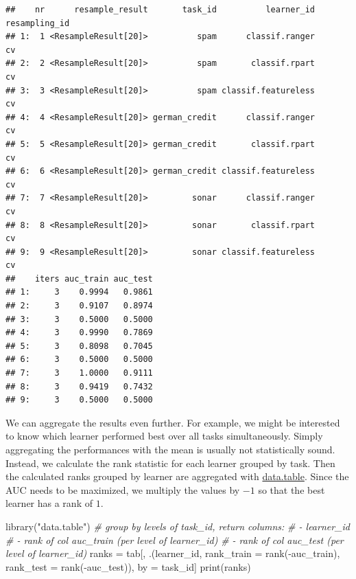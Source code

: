 \documentclass[
]{scrbook}
\newenvironment{Shaded}{\begin{snugshade}}{\end{snugshade}}
\newcommand{\AttributeTok}[1]{\textcolor[rgb]{0.77,0.63,0.00}{#1}}
\newcommand{\CommentTok}[1]{\textcolor[rgb]{0.56,0.35,0.01}{\textit{#1}}}
\newcommand{\FunctionTok}[1]{\textcolor[rgb]{0.00,0.00,0.00}{#1}}
\newcommand{\NormalTok}[1]{#1}
\newcommand{\OtherTok}[1]{\textcolor[rgb]{0.56,0.35,0.01}{#1}}
\newcommand{\SpecialCharTok}[1]{\textcolor[rgb]{0.00,0.00,0.00}{#1}}
\newcommand{\StringTok}[1]{\textcolor[rgb]{0.31,0.60,0.02}{#1}}
\renewenvironment{Shaded} {\begin{snugshade}\small} {\end{snugshade}}
\begin{document}
\begin{verbatim}
##    nr      resample_result       task_id          learner_id resampling_id
## 1:  1 <ResampleResult[20]>          spam      classif.ranger            cv
## 2:  2 <ResampleResult[20]>          spam       classif.rpart            cv
## 3:  3 <ResampleResult[20]>          spam classif.featureless            cv
## 4:  4 <ResampleResult[20]> german_credit      classif.ranger            cv
## 5:  5 <ResampleResult[20]> german_credit       classif.rpart            cv
## 6:  6 <ResampleResult[20]> german_credit classif.featureless            cv
## 7:  7 <ResampleResult[20]>         sonar      classif.ranger            cv
## 8:  8 <ResampleResult[20]>         sonar       classif.rpart            cv
## 9:  9 <ResampleResult[20]>         sonar classif.featureless            cv
##    iters auc_train auc_test
## 1:     3    0.9994   0.9861
## 2:     3    0.9107   0.8974
## 3:     3    0.5000   0.5000
## 4:     3    0.9990   0.7869
## 5:     3    0.8098   0.7045
## 6:     3    0.5000   0.5000
## 7:     3    1.0000   0.9111
## 8:     3    0.9419   0.7432
## 9:     3    0.5000   0.5000
\end{verbatim}

We can aggregate the results even further.
For example, we might be interested to know which learner performed best over all tasks simultaneously.
Simply aggregating the performances with the mean is usually not statistically sound.
Instead, we calculate the rank statistic for each learner grouped by task.
Then the calculated ranks grouped by learner are aggregated with \href{https://cran.r-project.org/package=data.table}{data.table}.
Since the AUC needs to be maximized, we multiply the values by \(-1\) so that the best learner has a rank of \(1\).

\begin{Shaded}
\begin{Highlighting}[]
\FunctionTok{library}\NormalTok{(}\StringTok{"data.table"}\NormalTok{)}
\CommentTok{\# group by levels of task\_id, return columns:}
\CommentTok{\# {-} learner\_id}
\CommentTok{\# {-} rank of col \textquotesingle{}{-}auc\_train\textquotesingle{} (per level of learner\_id)}
\CommentTok{\# {-} rank of col \textquotesingle{}{-}auc\_test\textquotesingle{} (per level of learner\_id)}
\NormalTok{ranks }\OtherTok{=}\NormalTok{ tab[, .(learner\_id, }\AttributeTok{rank\_train =} \FunctionTok{rank}\NormalTok{(}\SpecialCharTok{{-}}\NormalTok{auc\_train), }\AttributeTok{rank\_test =} \FunctionTok{rank}\NormalTok{(}\SpecialCharTok{{-}}\NormalTok{auc\_test)), by }\OtherTok{=}\NormalTok{ task\_id]}
\FunctionTok{print}\NormalTok{(ranks)}
\end{Highlighting}
\end{Shaded}
\end{document}
